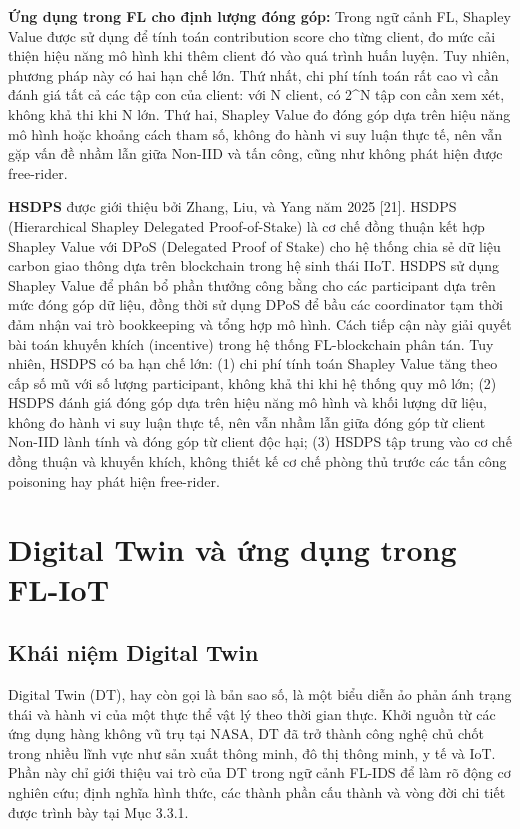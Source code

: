 \textbf{Ứng dụng trong FL cho định lượng đóng góp:} Trong ngữ cảnh FL, Shapley Value được sử dụng để tính toán contribution score cho từng client, đo mức cải thiện hiệu năng mô hình khi thêm client đó vào quá trình huấn luyện. Tuy nhiên, phương pháp này có hai hạn chế lớn. Thứ nhất, chi phí tính toán rất cao vì cần đánh giá tất cả các tập con của client: với N client, có 2\^{}N tập con cần xem xét, không khả thi khi N lớn. Thứ hai, Shapley Value đo đóng góp dựa trên hiệu năng mô hình hoặc khoảng cách tham số, không đo hành vi suy luận thực tế, nên vẫn gặp vấn đề nhầm lẫn giữa Non-IID và tấn công, cũng như không phát hiện được free-rider.

\textbf{HSDPS} được giới thiệu bởi Zhang, Liu, và Yang năm 2025 {[}21{]}. HSDPS (Hierarchical Shapley Delegated Proof-of-Stake) là cơ chế đồng thuận kết hợp Shapley Value với DPoS (Delegated Proof of Stake) cho hệ thống chia sẻ dữ liệu carbon giao thông dựa trên blockchain trong hệ sinh thái IIoT. HSDPS sử dụng Shapley Value để phân bổ phần thưởng công bằng cho các participant dựa trên mức đóng góp dữ liệu, đồng thời sử dụng DPoS để bầu các coordinator tạm thời đảm nhận vai trò bookkeeping và tổng hợp mô hình. Cách tiếp cận này giải quyết bài toán khuyến khích (incentive) trong hệ thống FL-blockchain phân tán. Tuy nhiên, HSDPS có ba hạn chế lớn: (1) chi phí tính toán Shapley Value tăng theo cấp số mũ với số lượng participant, không khả thi khi hệ thống quy mô lớn; (2) HSDPS đánh giá đóng góp dựa trên hiệu năng mô hình và khối lượng dữ liệu, không đo hành vi suy luận thực tế, nên vẫn nhầm lẫn giữa đóng góp từ client Non-IID lành tính và đóng góp từ client độc hại; (3) HSDPS tập trung vào cơ chế đồng thuận và khuyến khích, không thiết kế cơ chế phòng thủ trước các tấn công poisoning hay phát hiện free-rider.

\section{Digital Twin và ứng dụng trong FL-IoT}

\subsection{Khái niệm Digital Twin}
Digital Twin (DT), hay còn gọi là bản sao số, là một biểu diễn ảo phản ánh trạng thái và hành vi của một thực thể vật lý theo thời gian thực. Khởi nguồn từ các ứng dụng hàng không vũ trụ tại NASA, DT đã trở thành công nghệ chủ chốt trong nhiều lĩnh vực như sản xuất thông minh, đô thị thông minh, y tế và IoT. Phần này chỉ giới thiệu vai trò của DT trong ngữ cảnh FL-IDS để làm rõ động cơ nghiên cứu; định nghĩa hình thức, các thành phần cấu thành và vòng đời chi tiết được trình bày tại Mục 3.3.1.

